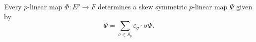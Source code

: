 Every $p$-linear map $\Phi: E^p \to F$ determines a skew symmetric $p$-linear map $\Psi$ given by
$$\Psi = \sum_{\sigma \in S_p} \varepsilon_\sigma \cdot \sigma \Phi.$$

